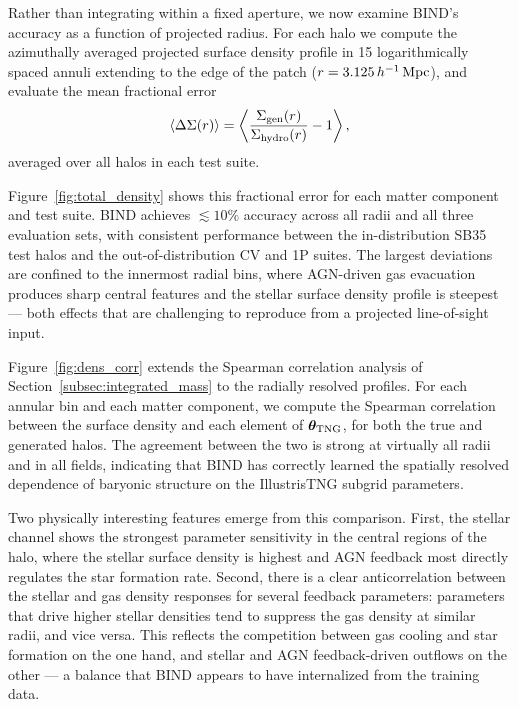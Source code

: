 \documentclass[linenumbers,trackchanges, twocolumn]{aastex701}
\begin{document}
Rather than integrating within a fixed aperture, we now examine \textsc{BIND}'s accuracy as a function of projected radius. For each halo we compute the azimuthally averaged projected surface density profile in 15 logarithmically spaced annuli extending to the edge of the patch ($r = 3.125\,h^{-1}\,{\rm Mpc}$), and evaluate the mean fractional error
\begin{equation}
    \langle \Delta\Sigma(r) \rangle
    = \left\langle
        \frac{\Sigma_{\rm gen}(r)}{\Sigma_{\rm hydro}(r)} - 1
      \right\rangle,
    \label{eq:profile_err}
\end{equation}
averaged over all halos in each test suite.

Figure~\ref{fig:total_density} shows this fractional error for each matter component and test suite. \textsc{BIND} achieves $\lesssim\!10\%$ accuracy across all radii and all three evaluation sets, with consistent performance between the in-distribution SB35 test halos and the out-of-distribution CV and 1P suites. The largest deviations are confined to the innermost radial bins, where AGN-driven gas evacuation produces sharp central features and the stellar surface density profile is steepest — both effects that are challenging to reproduce from a projected line-of-sight input.

Figure~\ref{fig:dens_corr} extends the Spearman correlation analysis of Section~\ref{subsec:integrated_mass} to the radially resolved profiles. For each annular bin and each matter component, we compute the Spearman correlation between the surface density and each element of $\boldsymbol{\theta}_{\rm TNG}$, for both the true and generated halos. The agreement between the two is strong at virtually all radii and in all fields, indicating that \textsc{BIND} has correctly learned the spatially resolved dependence of baryonic structure on the IllustrisTNG subgrid parameters.

Two physically interesting features emerge from this comparison. First, the stellar channel shows the strongest parameter sensitivity in the central regions of the halo, where the stellar surface density is highest and AGN feedback most directly regulates the star formation rate. Second, there is a clear anticorrelation between the stellar and gas density responses for several feedback parameters: parameters that drive higher stellar densities tend to suppress the gas density at similar radii, and vice versa. This reflects the competition between gas cooling and star formation on the one hand, and stellar and AGN feedback-driven outflows on the other — a balance that \textsc{BIND} appears to have internalized from the training data.
\end{document}

